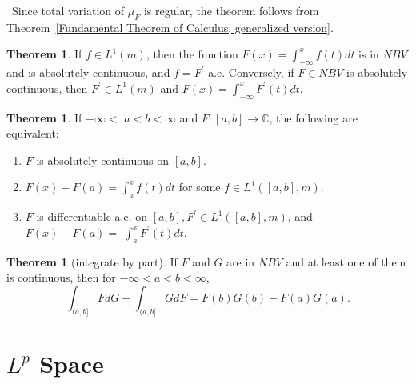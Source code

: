 \documentclass[12pt,a4paper]{book}
\newenvironment{prooff}{{\noindent\it\textcolor{cyan!40!black}{Proof}:}\,}{\par}
\newenvironment{enu}{\begin{enumerate}[(1)]}{\end{enumerate}}
\theoremstyle{definition}
\newtheorem{theo}[defn]{Theorem}
\begin{document}
\begin{prooff}
    Since total variation of $\mu_F$ is regular, the theorem follows from Theorem~\ref{Fundamental Theorem of Calculus, generalized version}.
\end{prooff}
\begin{theo}
    If $f \in L^1(m)$, then the function $F(x)=\int_{-\infty}^x f(t) d t$ is in $N B V$ and is absolutely continuous, and $f=F^{\prime}$ a.e.
    Conversely, if $F \in N B V$ is absolutely continuous, then $F^{\prime} \in L^1(m)$ and $F(x)=\int_{-\infty}^x F^{\prime}(t) d t$.
\end{theo}
\begin{theo}
    If $-\infty<$ $a<b<\infty$ and $F:[a, b] \rightarrow \mathbb{C}$, the following are equivalent:
    \begin{enu}
        \item $F$ is absolutely continuous on $[a, b]$.
        \item $F(x)-F(a)=\int_a^x f(t) d t$ for some $f \in L^1([a, b], m)$.
        \item $F$ is differentiable a.e. on $[a, b], F^{\prime} \in L^1([a, b], m)$, and $F(x)-F(a)=$ $\int_a^x F^{\prime}(t) d t$.
    \end{enu}
\end{theo}
\begin{theo}[integrate by part]
    If $F$ and $G$ are in $N B V$ and at least one of them is continuous, then for $-\infty<a<b<\infty$,
    $$
        \int_{(a, b]} F d G+\int_{(a, b]} G d F=F(b) G(b)-F(a) G(a) .
    $$
\end{theo}
\section{$L^p$ Space}
\end{document}
